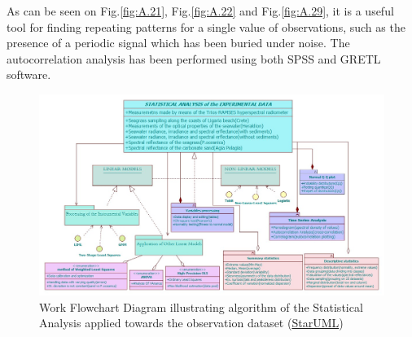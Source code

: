 \documentclass[11pt]{article}
\begin{document}
As can be seen on Fig.\ref{fig:A.21}, Fig.\ref{fig:A.22} and Fig.\ref{fig:A.29}, it is a useful tool for finding repeating patterns for a single value of observations, such as the presence of a periodic signal which has been buried under noise. The autocorrelation analysis has been performed using both \ac{SPSS} and \ac{GRETL} software. 

\begin{figure}[H]
	\centering
	\includegraphics[scale=0.5, angle=90]{UML_StatAn.jpg}
	\caption{Work Flowchart Diagram illustrating algorithm of the Statistical Analysis applied towards the observation dataset (\href{http://staruml.sourceforge.net/en/}{StarUML})}
	\label{fig:4.12}
\end{figure}
\end{document}
